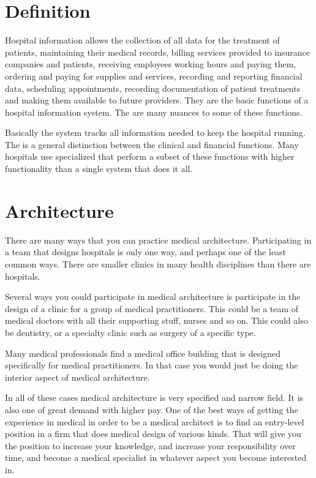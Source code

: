 \documentclass[11pt,a4paper,twoside]{article}
\begin{document}
\section{Definition}
Hospital information allows the collection of all data for the treatment of patients, maintaining their medical records, billing services provided to insurance companies and patients, receiving employees working hours and paying them, ordering and paying for supplies and services, recording and reporting financial data, scheduling appointments, recording documentation of patient treatments and making them available to future providers. They are the basic functions of a hospital information system. The are many nuances to some of these functions.\par
Basically the system tracks all information needed to keep the hospital running. The is a general distinction between the clinical and financial functions. Many hospitals use specialized that perform a subset of these functions with higher functionality than a single system that does it all.

\section{Architecture}
There are many ways that you can practice medical architecture. Participating in a team that designs hospitals is only one way, and perhaps one of the least common ways. There are smaller clinics in many health disciplines than there are hospitals.\par
Several ways you could participate in medical architecture is participate in the design of a clinic for a group of medical practitioners. This could be a team of medical doctors with all their supporting stuff, nurses and so on. This could also be dentistry, or a specialty clinic such as surgery of a specific type.\par
Many medical professionals find a medical office building that is designed specifically for medical practitioners. In that case you would just be doing the interior aspect of medical architecture.\par
In all of these cases medical architecture is very specified and narrow field. It is also one of great demand with higher pay. One of the best ways of getting the experience in medical in order to be a medical architect is to find an entry-level position in a firm that does medical design of various kinds. That will give you the position to increase your knowledge, and increase your responsibility over time, and become a medical specialist in whatever aspect you become interested in.
\end{document}
